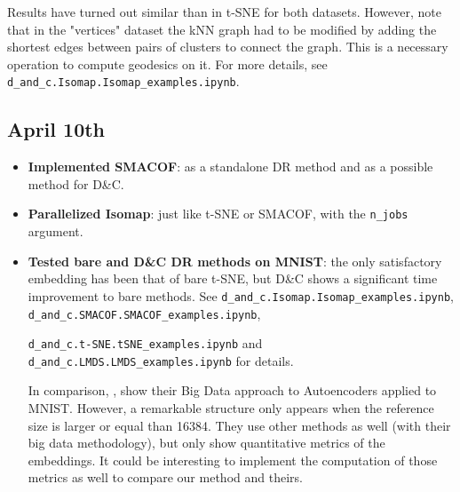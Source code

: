 \documentclass[a4paper,12pt]{article}
\begin{document}
\begin{itemize}
    Results have turned out similar than in t-SNE for both datasets. However, note that in the "vertices" dataset the kNN graph had to be modified by adding the shortest edges between pairs of clusters to connect the graph. This is a necessary operation to compute geodesics on it. For more details, see \verb|d_and_c.Isomap.Isomap_examples.ipynb|.
\end{itemize}

\subsection{April 10th}
\begin{itemize}
    \item \textbf{Implemented SMACOF}: as a standalone DR method and as a possible method for D\&C.
    \item \textbf{Parallelized Isomap}: just like t-SNE or SMACOF, with the \verb|n_jobs| argument.
    \item \textbf{Tested bare and D\&C DR methods on MNIST}: the only satisfactory embedding has been that of bare t-SNE, but D\&C shows a significant time improvement to bare methods. See \verb|d_and_c.Isomap.Isomap_examples.ipynb|, \verb|d_and_c.SMACOF.SMACOF_examples.ipynb|,
    
    \verb|d_and_c.t-SNE.tSNE_examples.ipynb| and \verb|d_and_c.LMDS.LMDS_examples.ipynb| for details.

    In comparison, \cite{reichmann2024outofcoredimensionalityreductionlarge}, show their Big Data approach to Autoencoders applied to MNIST. However, a remarkable structure only appears when the reference size is larger or equal than 16384. They use other methods as well (with their big data methodology), but only show quantitative metrics of the embeddings. It could be interesting to implement the computation of those metrics as well to compare our method and theirs.
\end{itemize}
\end{document}
